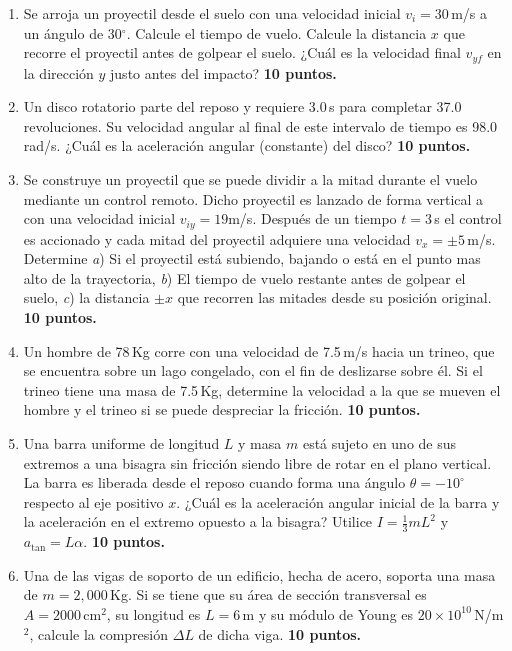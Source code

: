 \documentclass{article}
\begin{document}
\begin{enumerate}

\item Se arroja un proyectil desde el suelo con una velocidad inicial
$v_{i}=30$\,m/s a un \'angulo de 30$^{\circ}$. Calcule el tiempo de vuelo.
Calcule la distancia $x$ que recorre el proyectil antes de golpear el suelo.
¿Cuál es la velocidad final $v_{yf}$ en la dirección $y$ justo antes del
impacto?
\hfill \textbf{10 puntos.}

\item Un disco rotatorio parte del reposo y requiere 3.0\,s para completar 37.0
revoluciones. Su velocidad angular al final de este intervalo de tiempo es
98.0\,rad/s. ¿Cuál es la aceleración angular (constante) del disco?
\hfill \textbf{10 puntos.}

\item Se construye un proyectil que se puede dividir a la mitad durante el
vuelo mediante un control remoto. Dicho proyectil es lanzado de forma vertical
a con una velocidad inicial $v_{iy}=19$m/s. Después de un tiempo $t=3$\,s el
control es accionado y cada mitad del proyectil adquiere una velocidad $v_{x} =
\pm5$\,m/s. Determine \emph{a}) Si el proyectil está subiendo, bajando o está
en el punto mas alto de la trayectoria, \emph{b}) El tiempo de vuelo restante
antes de golpear el suelo, \emph{c}) la distancia $\pm x$ que recorren las
mitades desde su posición original.
\hfill \textbf{10 puntos.}

\item Un hombre de 78\,Kg corre con una velocidad de 7.5\,m/s hacia un trineo, 
que se encuentra sobre un lago congelado, con el fin de deslizarse sobre él. Si
el trineo tiene una masa de 7.5\,Kg, determine la velocidad a la que se mueven
el hombre y el trineo si se puede despreciar la fricción.
\hfill \textbf{10 puntos.}

\item Una barra uniforme de longitud $L$ y masa $m$ está sujeto en uno de sus
extremos a una bisagra sin fricción siendo libre de rotar en el plano vertical.
La barra es liberada desde el reposo cuando forma una ángulo $\theta =
-10^{\circ}$  respecto al eje positivo $x$. ¿Cuál es la aceleración angular
inicial de la barra y la aceleración en el extremo opuesto a la bisagra?
Utilice $I= \frac{1}{3}mL^{2}$ y $a_{\tan} = L \alpha$.
\hfill \textbf{10 puntos.}

\item Una de las vigas de soporto de un edificio, hecha de acero, soporta una
masa de $m=2,000$\,Kg. Si se tiene que su área de sección transversal es
$A=2000\,\text{cm}^{2}$, su longitud es $L=6$\,m y su módulo de Young es $20
\times 10^{10}$\,N/m$^{2}$, calcule la compresión $\Delta L$ de dicha viga.
\hfill \textbf{10 puntos.}

\end{enumerate}
\end{document}
